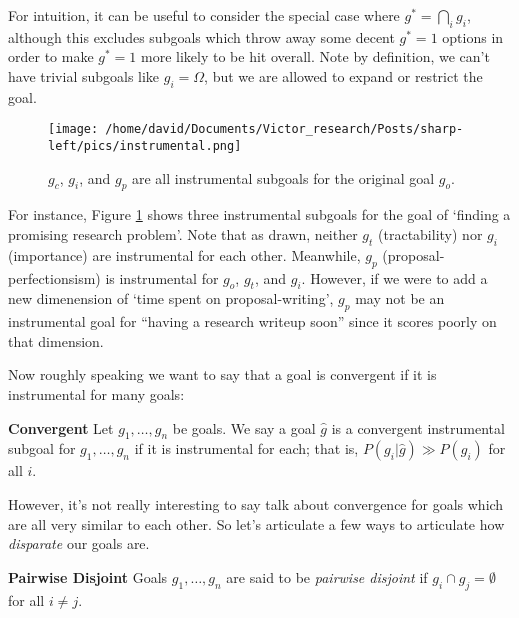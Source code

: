 \documentclass{article}
\begin{document}
For intuition, it can be useful to consider the special case where $g^* = \bigcap_i g_i$, although this excludes subgoals which throw away some decent $g^*=1$ options in order to make $g^*=1$ more likely to be hit overall. Note by definition, we can't have trivial subgoals like $g_i=\Omega$, but we are allowed to expand or restrict the goal. 

\begin{figure}[ht]
    \centering
    \texttt{[image: /home/david/Documents/Victor\_research/Posts/sharp-left/pics/instrumental.png]} 
    \caption{$g_c$, $g_i$, and $g_p$ are all instrumental subgoals for the original goal $g_o$.}
    \label{fig:instrumental} 
\end{figure}

For instance, Figure \ref{fig:instrumental} shows three instrumental subgoals for the goal of `finding a promising research problem'. Note that as drawn, neither $g_t$ (tractability) nor $g_i$ (importance) are instrumental for each other. Meanwhile, $g_p$ (proposal-perfectionsism) is instrumental for $g_o$, $g_t$, and $g_i$. However, if we were to add a new dimenension of `time spent on proposal-writing', $g_p$ may not be an instrumental goal for ``having a research writeup soon'' since it scores poorly on that dimension.

Now roughly speaking we want to say that a goal is convergent if it is instrumental for many goals:

\begin{definition}{\textbf{Convergent}}
    Let $g_1, \dots, g_n$ be goals. We say a goal $\hat{g}$ is a convergent instrumental subgoal for $g_1, \dots, g_n$ if it is instrumental for each; that is, $P(g_i|\hat{g})\gg P(g_i)$ for all $i$.
\end{definition}

However, it's not really interesting to say talk about convergence for goals which are all very similar to each other. So let's articulate a few ways to articulate how \emph{disparate} our goals are.

\begin{definition}{\textbf{Pairwise Disjoint}}
    Goals $g_1, \dots, g_n$ are said to be \emph{pairwise disjoint} if $g_i\cap g_j=\emptyset$ for all $i \neq j$.
\end{definition}

\end{document}
